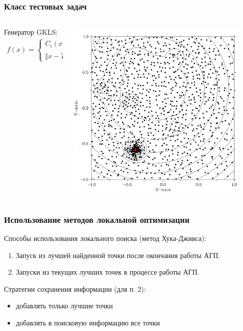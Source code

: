 \documentclass[aspectratio=1610]{beamer}
\begin{document}
\begin{frame}
  \frametitle{Класс тестовых задач}
  \begin{columns}
    \begin{column}{0.5\textwidth}
      Генератор GKLS:
      \begin{displaymath}
        \begin{matrix}
          f(x)=
          \left\{
          \begin{matrix}
          C_i(x), x \in S_i, i\in 2,\dots ,m \\
          \Vert x-T \Vert^2 + t, x\not\in S_2,\dots,S_m
          \end{matrix} \right.
        \end{matrix}
      \end{displaymath}
    \end{column}
    \begin{column}{0.5\textwidth}
      \centerline{\includegraphics[width=0.9\textwidth]{gkls_loc.png}}
    \end{column}
  \end{columns}
\end{frame}

\begin{frame}
\frametitle{Использование методов локальной оптимизации}
Способы использования локального поиска (метод Хука-Дживса):\
\begin{enumerate}
  \item Запуск из лучшей найденной точки после окончания работы АГП.
  \item Запуски из текущих лучших точек в процессе работы АГП.
\end{enumerate}
\bigbreak
Стратегии сохранения информации (для п. 2):
\begin{itemize}
  \item добавлять только лучшие точки
  \item добавлять в поисковую информацию все точки
\end{itemize}
\end{frame}
\end{document}
